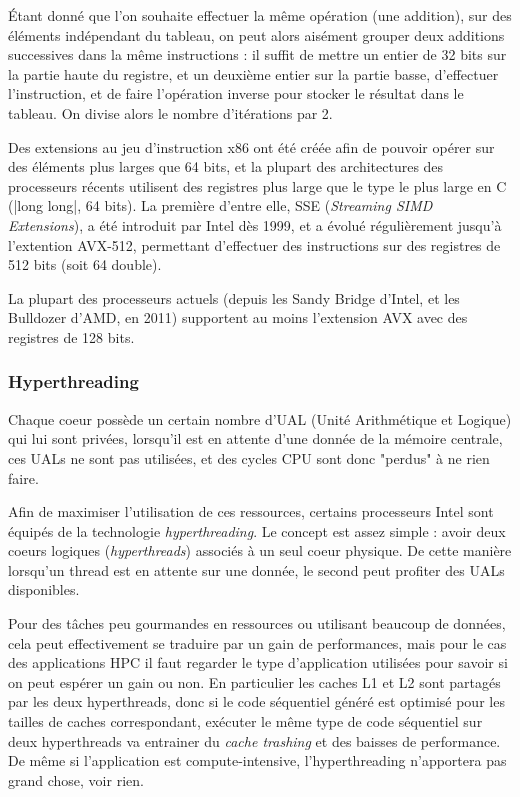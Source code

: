 Étant donné que l'on souhaite effectuer la même opération (une addition), sur des éléments indépendant du tableau, on peut alors aisément grouper deux additions successives dans la même instructions : il suffit de mettre un entier de 32 bits sur la partie haute du registre, et un deuxième entier sur la partie basse, d'effectuer l'instruction, et de faire l'opération inverse pour stocker le résultat dans le tableau.
On divise alors le nombre d'itérations par 2.

Des extensions au jeu d'instruction x86 ont été créée afin de pouvoir opérer sur des éléments plus larges que 64 bits, et la plupart des architectures des processeurs récents utilisent des registres plus large que le type le plus large en C (|long long|, 64 bits).
La première d'entre elle, SSE (\emph{Streaming SIMD Extensions}), a été introduit par Intel dès 1999, et a évolué régulièrement jusqu'à l'extention AVX-512, permettant d'effectuer des instructions sur des registres de 512 bits (soit 64 double).

La plupart des processeurs actuels (depuis les Sandy Bridge d'Intel, et les Bulldozer d'AMD, en 2011) supportent au moins l'extension AVX avec des registres de 128 bits.

\subsubsection{Hyperthreading}

Chaque coeur possède un certain nombre d'UAL (Unité Arithmétique et Logique) qui lui sont privées, lorsqu'il est en attente d'une donnée de la mémoire centrale, ces UALs ne sont pas utilisées, et des cycles CPU sont donc "perdus" à ne rien faire.

Afin de maximiser l'utilisation de ces ressources, certains processeurs Intel sont équipés de la technologie \emph{hyperthreading}.
Le concept est assez simple : avoir deux coeurs logiques (\emph{hyperthreads}) associés à un seul coeur physique.
De cette manière lorsqu'un thread est en attente sur une donnée, le second peut profiter des UALs disponibles.

Pour des tâches peu gourmandes en ressources ou utilisant beaucoup de données, cela peut effectivement se traduire par un gain de performances, mais pour le cas des applications HPC il faut regarder le type d'application utilisées pour savoir si on peut espérer un gain ou non.
En particulier les caches L1 et L2 sont partagés par les deux hyperthreads, donc si le code séquentiel généré est optimisé pour les tailles de caches correspondant, exécuter le même type de code séquentiel sur deux hyperthreads va entrainer du \emph{cache trashing} et des baisses de performance.
De même si l'application est compute-intensive, l'hyperthreading n'apportera pas grand chose, voir rien.

